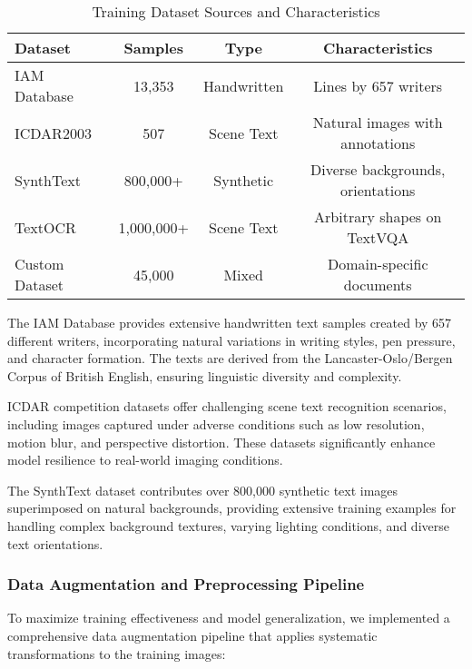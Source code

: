 \begin{table}[H]
\centering
\small
\caption{Training Dataset Sources and Characteristics}
\label{tab:training_datasets}
\begin{tabular}{lccc}
\toprule
\textbf{Dataset} & \textbf{Samples} & \textbf{Type} & \textbf{Characteristics} \\
\midrule
IAM Database & 13,353 & Handwritten & Lines by 657 writers \\
ICDAR2003 & 507 & Scene Text & Natural images with annotations \\
SynthText & 800,000+ & Synthetic & Diverse backgrounds, orientations \\
TextOCR & 1,000,000+ & Scene Text & Arbitrary shapes on TextVQA \\
Custom Dataset & 45,000 & Mixed & Domain-specific documents \\
\bottomrule
\end{tabular}
\end{table}

The IAM Database provides extensive handwritten text samples created by 657 different writers, incorporating natural variations in writing styles, pen pressure, and character formation. The texts are derived from the Lancaster-Oslo/Bergen Corpus of British English, ensuring linguistic diversity and complexity.

ICDAR competition datasets offer challenging scene text recognition scenarios, including images captured under adverse conditions such as low resolution, motion blur, and perspective distortion. These datasets significantly enhance model resilience to real-world imaging conditions.

The SynthText dataset contributes over 800,000 synthetic text images superimposed on natural backgrounds, providing extensive training examples for handling complex background textures, varying lighting conditions, and diverse text orientations.

\subsubsection{Data Augmentation and Preprocessing Pipeline}

To maximize training effectiveness and model generalization, we implemented a comprehensive data augmentation pipeline that applies systematic transformations to the training images:

